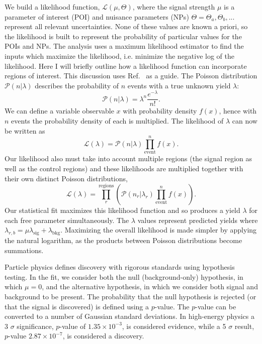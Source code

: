 We build a likelihood function, $\mathcal{L}(\mu,\Theta)$, where the signal strength $\mu$ is a parameter of interest (POI) and nuisance parameters (NPs) $\Theta=\Theta_a,\Theta_b,...$ represent all relevant uncertainties. None of these values are known a priori, so the likelihood is built to represent the probability of particular values for the POIs and NPs. The analysis uses a maximum likelihood estimator to find the inputs which maximize the likelihood, i.e. minimize the negative log of the likelihood. Here I will briefly outline how a likelihood function can incorporate regions of interest. This discussion uses Ref.~\cite{cranmer2015practical} as a guide. The Poisson distribution $\mathcal{P}(n|\lambda)$ describes the probability of $n$ events with a true unknown yield $\lambda$:
\begin{equation}
\mathcal{P}(n|\lambda)= \lambda^n\frac{e^{-\lambda}}{n!}.
\end{equation}
We can define a variable observable $x$ with probability density $f(x)$, hence with $n$ events the probability density of each is multiplied. The likelihood of $\lambda$ can now be written as
\begin{equation}
\mathcal{L}(\lambda)=\mathcal{P}(n|\lambda)\prod_{\text{event}}^n f(x).
\end{equation}
Our likelihood also must take into account multiple regions (the signal region as well as the control regions) and these likelihoods are multiplied together with their own distinct Poisson distributions,
\begin{equation}
\mathcal{L}(\lambda)=\prod_r^{\text{regions}}(\mathcal{P}(n_r|\lambda_r)\prod_{\text{event}}^n f(x)).
\end{equation}
Our statistical fit maximizes this likelihood function and so produces a yield $\lambda$ for each free parameter simultaneously. The $\lambda$ values represent predicted yields where $\lambda_{r,b} = \mu \lambda_{\text{sig}}+\lambda_{\text{bkg}}$. Maximizing the overall likelihood is made simpler by applying the natural logarithm, as the products between Poisson distributions become summations.  

Particle physics defines discovery with rigorous standards using hypothesis testing. In the fit, we consider both the null (background-only) hypothesis, in which $\mu=0$, and the alternative hypothesis, in which we consider both signal and background to be present. The probability that the null hypothesis is rejected (or that the signal is discovered) is defined using a $p$-value. The $p$-value can be converted to a number of Gaussian standard deviations. In high-energy physics a 3 $\sigma$ significance, $p$-value of $1.35 \times 10^{-3}$, is considered evidence, while a 5 $\sigma$ result, $p$-value $2.87\times10^{-7}$, is considered a discovery.

